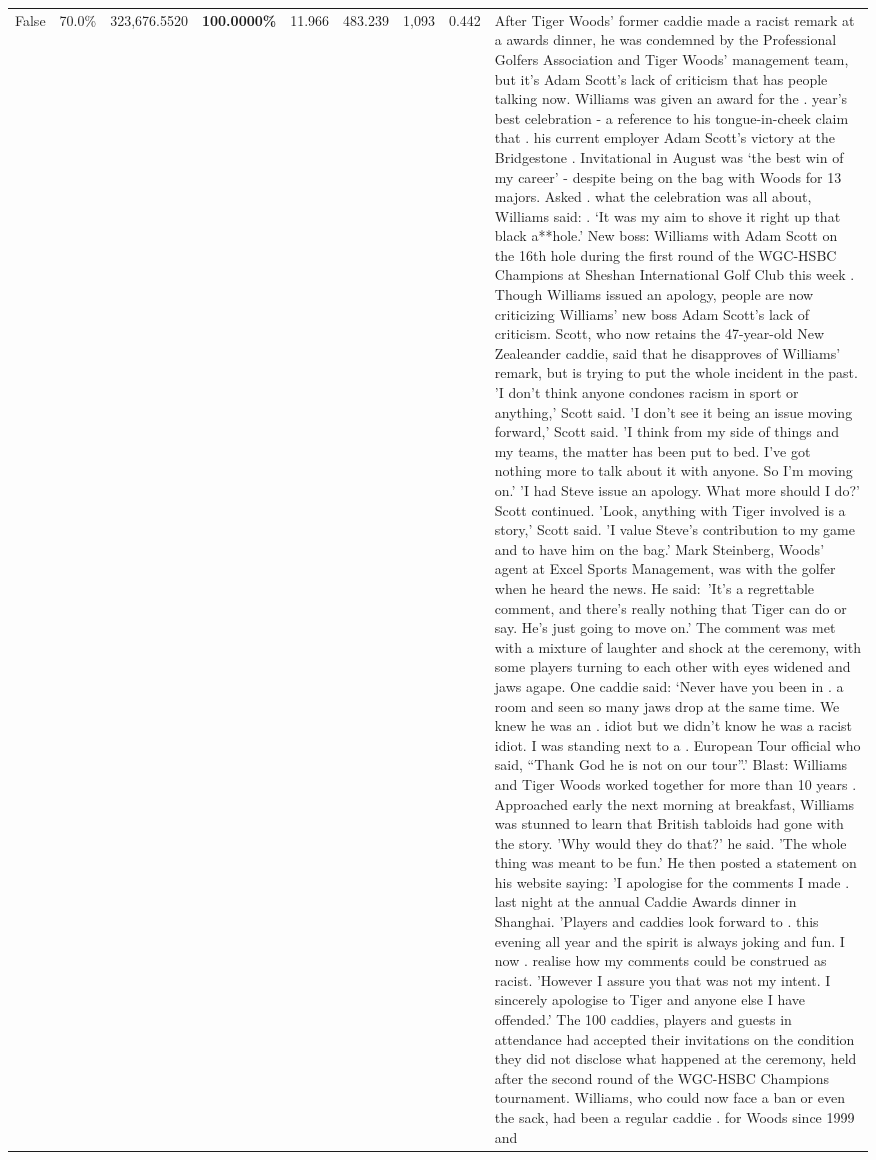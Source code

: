 \begin{table}[H]
\begin{tabular}{lllrlllll}
False & 70.0\% & 323,676.5520 & \bfseries \color{red} 100.0000\% & 11.966 & 483.239 & 1,093 & 0.442 & After Tiger Woods' former caddie made a racist remark at a awards dinner, he was condemned by the Professional Golfers Association and Tiger Woods' management team, but it's Adam Scott's lack of criticism that has people talking now. Williams was given an award for the . year’s best celebration - a reference to his tongue-in-cheek claim that . his current employer Adam Scott’s victory at the Bridgestone . Invitational in August was ‘the best win of my career’ - despite being on the bag with Woods for 13 majors. Asked . what the celebration was all about, Williams said: . ‘It was my aim to shove it right up that black a**hole.’ New boss: Williams with Adam Scott  on the 16th hole during the first round of the WGC-HSBC Champions at Sheshan International Golf Club this week . Though Williams issued an apology, people are now criticizing Williams' new boss Adam Scott's lack of criticism. Scott, who now retains the 47-year-old New Zealeander caddie, said that he disapproves of Williams' remark, but is trying to put the whole incident in the past. 'I don't think anyone condones racism in sport or anything,' Scott said. 'I don't see it being an issue moving forward,' Scott said. 'I think from my side of things and my teams, the matter has been put to bed. I've got nothing more to talk about it with anyone. So I'm moving on.' 'I had Steve issue an apology. What more should I do?' Scott continued. 'Look, anything with Tiger involved is a story,' Scott said. 'I value Steve's contribution to my game and to have him on the bag.' Mark Steinberg, Woods' agent at Excel Sports Management, was with the golfer when he heard the news. He said: 'It's a regrettable comment, and there's really nothing that Tiger can do or say. He's just going to move on.' The comment was met with a mixture of laughter and shock at the ceremony, with some players turning to each other with eyes widened and jaws agape. One caddie said: ‘Never have you been in . a room and seen so many jaws drop at the same time. We knew he was an . idiot but we didn’t know he was a racist idiot. I was standing next to a . European Tour official who said, “Thank God he is not on our tour”.’ Blast: Williams and Tiger Woods worked together for more than 10 years . Approached early the next morning at breakfast, Williams was stunned to learn that British tabloids had gone with the story. 'Why would they do that?' he said. 'The whole thing was meant to be fun.' He then posted a statement on his website saying: 'I apologise for the comments I made . last night at the annual Caddie Awards dinner in Shanghai. 'Players and caddies look forward to . this evening all year and the spirit is always joking and fun. I now . realise how my comments could be construed as racist. 'However I assure you that was not my intent. I sincerely apologise to Tiger and anyone else I have offended.' The 100 caddies, players and guests in attendance had accepted their invitations on the condition they did not disclose what happened at the ceremony, held after the second round of the WGC-HSBC Champions tournament. Williams, who could now face a ban or even the sack, had been a regular caddie . for Woods since 1999 and 
\end{tabular}
\end{table}
